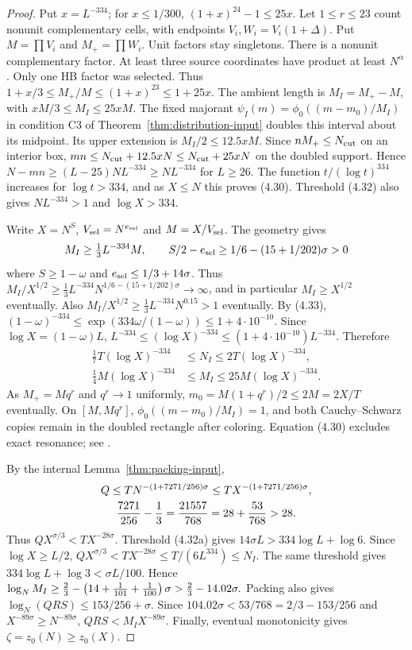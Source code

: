 \begin{proof}
Put $x=L^{-334}$; for $x\le1/300$, $(1+x)^{24}-1\le25x$.
Let $1\le r\le23$ count nonunit complementary cells, with endpoints $V_i,W_i=V_i(1+\Delta)$.
Put $M=\prod V_i$ and $M_+=\prod W_i$.
Unit factors stay singletons.
There is a nonunit complementary factor.
At least three source coordinates have product at least $N^\alpha$.
Only one HB factor was selected.
Thus $1+x/3\le M_+/M\le(1+x)^{23}\le1+25x$.
The ambient length is $M_I=M_+-M$, with $xM/3\le M_I\le25xM$.
The fixed majorant $\psi_I(m)=\phi_0((m-m_0)/M_I)$ in condition C3
of Theorem~\ref{thm:distribution-input} doubles this interval about its midpoint.
Its upper extension is $M_I/2\le12.5xM$.
Since $nM_+\le N_{\rm cut}$ on an interior box,
$mn\le N_{\rm cut}+12.5xN\le N_{\rm cut}+25xN$ on the doubled support.
Hence $N-mn\ge(L-25)NL^{-334}\ge NL^{-334}$ for $L\ge26$.
The function $t/(\log t)^{334}$ increases for $\log t>334$, and as $X\le N$ this proves (4.30).
Threshold (4.32) also gives $NL^{-334}>1$ and $\log X>334$.

Write $X=N^S$, $V_{\rm sel}=N^{e_{\rm sel}}$ and $M=X/V_{\rm sel}$.
The geometry gives
\[
 M_I\ge\tfrac13L^{-334}M,
 \qquad
 S/2-e_{\rm sel}\ge1/6-(15+1/202)\sigma>0
\]
where $S\ge1-\omega$ and $e_{\rm sel}\le1/3+14\sigma$.
Thus $M_I/X^{1/2}\ge\tfrac13L^{-334}N^{1/6-(15+1/202)\sigma}\to\infty$,
and in particular $M_I\ge X^{1/2}$ eventually.
Also $M_I/X^{1/2}\ge\tfrac13L^{-334}N^{0.15}>1$ eventually.
By (4.33),
$(1-\omega)^{-334}
 \le\exp(334\omega/(1-\omega))\le1+4\cdot10^{-10}.$
Since $\log X=(1-\omega)L$,
$L^{-334}\le(\log X)^{-334}\le(1+4\cdot10^{-10})L^{-334}$.
Therefore
\[
\begin{aligned}
 \tfrac17T(\log X)^{-334}&\le N_I\le2T(\log X)^{-334},\\
 \tfrac14M(\log X)^{-334}&\le M_I\le25M(\log X)^{-334}.
\end{aligned}
\]
As $M_+=Mq^r$ and $q^r\to1$ uniformly,
$m_0=M(1+q^r)/2\le2M=2X/T$ eventually.
On $[M,Mq^r]$, $\phi_0((m-m_0)/M_I)=1$, and both Cauchy--Schwarz copies remain in the doubled rectangle after coloring.
Equation (4.30) excludes exact resonance; see \cite[(3.10)]{Z1}.

By the internal Lemma~\ref{thm:packing-input},
\[
\begin{gathered}
 Q\le TN^{-(1+7271/256)\sigma}\le TX^{-(1+7271/256)\sigma},\\
 {7271\over256}-{1\over3}={21557\over768}=28+{53\over768}>28.
\end{gathered}
\]
Thus $QX^{\sigma/3}<TX^{-28\sigma}$.
Threshold (4.32a) gives $14\sigma L>334\log L+\log6$.
Since $\log X\ge L/2$,
$QX^{\sigma/3}<TX^{-28\sigma}
 \le T/(6L^{334})\le N_I.$
The same threshold gives $334\log L+\log3<\sigma L/100$.
Hence
$\log_NM_I\ge{2\over3}
 -\left(14+{1\over101}+{1\over100}\right)\sigma
 >{2\over3}-14.02\sigma.$
Packing also gives $\log_N(QRS)\le153/256+\sigma$.
Since $104.02\sigma<53/768=2/3-153/256$ and $X^{-89\sigma}\ge N^{-89\sigma}$,
$QRS<M_IX^{-89\sigma}$.
Finally, eventual monotonicity gives $\zeta=z_0(N)\ge z_0(X)$.
\end{proof}


